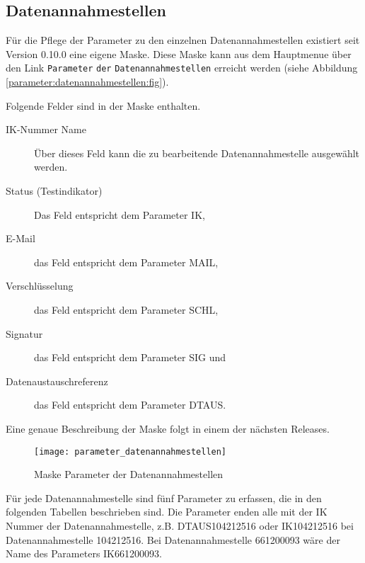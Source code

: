 \subsection{Datenannahmestellen}\label{datenannahmestellen:abs}
Für die Pflege der Parameter zu den einzelnen Datenannahmestellen
existiert seit Version 0.10.0 eine eigene Maske. Diese Maske kann aus dem
Hauptmenue über den Link \verb|Parameter| \verb|der| \verb|Datenannahmestellen|
erreicht werden (siehe Abbildung \vref{parameter:datenannahmestellen:fig}).

Folgende Felder sind in der Maske enthalten.
\begin{description}
\item[IK-Nummer Name] 
Über dieses Feld kann die zu bearbeitende Datenannahmestelle 
ausgewählt werden.
\item[Status (Testindikator)]
Das Feld  entspricht dem Parameter IK,
\item[E-Mail]
das Feld  entspricht dem Parameter MAIL,
\item[Verschlüsselung]
das Feld  entspricht dem Parameter SCHL,
\item[Signatur]
das Feld  entspricht dem Parameter SIG und
\item[Datenaustauschreferenz]
das Feld  entspricht dem Parameter DTAUS.
\end{description}

Eine genaue Beschreibung der Maske folgt in einem der nächsten Releases.

\begin{figure}[ht]
\centering
\texttt{[image: parameter\_datenannahmestellen]}
\caption{Maske Parameter der Datenannahmestellen\label{parameter:datenannahmestellen:fig}}
\end{figure}

Für jede Datenannahmestelle sind fünf Parameter zu erfassen, die in den
folgenden Tabellen beschrieben sind. Die Parameter enden alle mit der
IK Nummer der Datenannahmestelle, z.B. DTAUS104212516 oder 
IK104212516 bei Datenannahmestelle 
104212516. Bei Datenannahmestelle 661200093 wäre der Name des Parameters
IK661200093.

